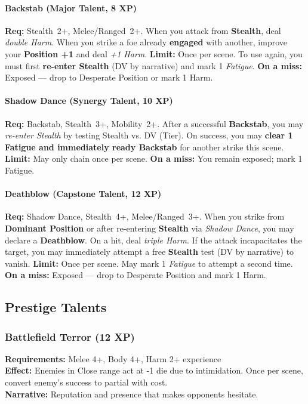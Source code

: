 \paragraph{Backstab (Major Talent, 8 XP)} 
\textbf{Req:} Stealth~2+, Melee/Ranged~2+.  
When you attack from \textbf{Stealth}, deal \emph{double Harm}.  
When you strike a foe already \textbf{engaged} with another, improve your \textbf{Position +1} and deal \emph{+1 Harm}.  
\textbf{Limit:} Once per scene. To use again, you must first \textbf{re-enter Stealth} (DV by narrative) and mark 1 \emph{Fatigue}.  
\textbf{On a miss:} Exposed --- drop to Desperate Position or mark 1 Harm.  

\paragraph{Shadow Dance (Synergy Talent, 10 XP)} 
\textbf{Req:} Backstab, Stealth~3+, Mobility~2+.  
After a successful \textbf{Backstab}, you may \emph{re-enter Stealth} by testing Stealth vs. DV (Tier).  
On success, you may \textbf{clear 1 Fatigue and immediately ready Backstab} for another strike this scene.  
\textbf{Limit:} May only chain once per scene.  
\textbf{On a miss:} You remain exposed; mark 1 Fatigue.  

\paragraph{Deathblow (Capstone Talent, 12 XP)}  
\textbf{Req:} Shadow Dance, Stealth~4+, Melee/Ranged~3+.  
When you strike from \textbf{Dominant Position} or after re-entering \textbf{Stealth} via \emph{Shadow Dance}, you may declare a \textbf{Deathblow}.  
On a hit, deal \emph{triple Harm}. If the attack incapacitates the target, you may immediately attempt a free \textbf{Stealth} test (DV by narrative) to vanish.  
\textbf{Limit:} Once per scene. May mark 1 \emph{Fatigue} to attempt a second time.  
\textbf{On a miss:} Exposed --- drop to Desperate Position and mark 1 Harm.  

\subsection{Prestige Talents}

\subsubsection{Battlefield Terror (12 XP)}
\textbf{Requirements:} Melee 4+, Body 4+, Harm 2+ experience \\
\textbf{Effect:} Enemies in Close range act at -1 die due to intimidation. Once per scene, convert enemy's success to partial with cost. \\
\textbf{Narrative:} Reputation and presence that makes opponents hesitate.

